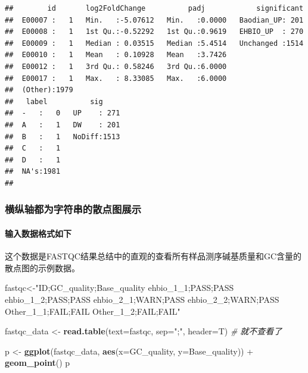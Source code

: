 \documentclass[]{article}
\newenvironment{Shaded}{\begin{snugshade}}{\end{snugshade}}
\newcommand{\KeywordTok}[1]{\textcolor[rgb]{0.13,0.29,0.53}{\textbf{{#1}}}}
\newcommand{\DataTypeTok}[1]{\textcolor[rgb]{0.13,0.29,0.53}{{#1}}}
\newcommand{\StringTok}[1]{\textcolor[rgb]{0.31,0.60,0.02}{{#1}}}
\newcommand{\CommentTok}[1]{\textcolor[rgb]{0.56,0.35,0.01}{\textit{{#1}}}}
\newcommand{\NormalTok}[1]{{#1}}
\numberwithin{figure}{section}
\numberwithin{table}{section}
\theoremstyle{definition}
\theoremstyle{definition}
\theoremstyle{definition}
\theoremstyle{remark}
\begin{document}
\begin{verbatim}
##        id       log2FoldChange          padj            significant  
##  E00007 :   1   Min.   :-5.07612   Min.   :0.0000   Baodian_UP: 201  
##  E00008 :   1   1st Qu.:-0.52292   1st Qu.:0.9619   EHBIO_UP  : 270  
##  E00009 :   1   Median : 0.03515   Median :5.4514   Unchanged :1514  
##  E00010 :   1   Mean   : 0.10928   Mean   :3.7426                    
##  E00012 :   1   3rd Qu.: 0.58246   3rd Qu.:6.0000                    
##  E00017 :   1   Max.   : 8.33085   Max.   :6.0000                    
##  (Other):1979                                                        
##   label          sig      
##  -   :   0   UP    : 271  
##  A   :   1   DW    : 201  
##  B   :   1   NoDiff:1513  
##  C   :   1                
##  D   :   1                
##  NA's:1981                
## 
\end{verbatim}

\subsubsection{横纵轴都为字符串的散点图展示}

\paragraph{输入数据格式如下}

这个数据是FASTQC结果总结中的直观的查看所有样品测序碱基质量和GC含量的散点图的示例数据。

\begin{Shaded}
\begin{Highlighting}[]
\NormalTok{fastqc<-}\StringTok{"ID;GC_quality;Base_quality}
\StringTok{ehbio_1_1;PASS;PASS}
\StringTok{ehbio_1_2;PASS;PASS}
\StringTok{ehbio_2_1;WARN;PASS}
\StringTok{ehbio_2_2;WARN;PASS}
\StringTok{Other_1_1;FAIL;FAIL}
\StringTok{Other_1_2;FAIL;FAIL"}

\NormalTok{fastqc_data <-}\StringTok{ }\KeywordTok{read.table}\NormalTok{(}\DataTypeTok{text=}\NormalTok{fastqc, }\DataTypeTok{sep=}\StringTok{";"}\NormalTok{, }\DataTypeTok{header=}\NormalTok{T)}
\CommentTok{# 就不查看了}
\end{Highlighting}
\end{Shaded}

\begin{Shaded}
\begin{Highlighting}[]
\NormalTok{p <-}\StringTok{ }\KeywordTok{ggplot}\NormalTok{(fastqc_data, }\KeywordTok{aes}\NormalTok{(}\DataTypeTok{x=}\NormalTok{GC_quality, }\DataTypeTok{y=}\NormalTok{Base_quality)) +}\StringTok{ }\KeywordTok{geom_point}\NormalTok{()}
\NormalTok{p}
\end{Highlighting}
\end{Shaded}
\end{document}
